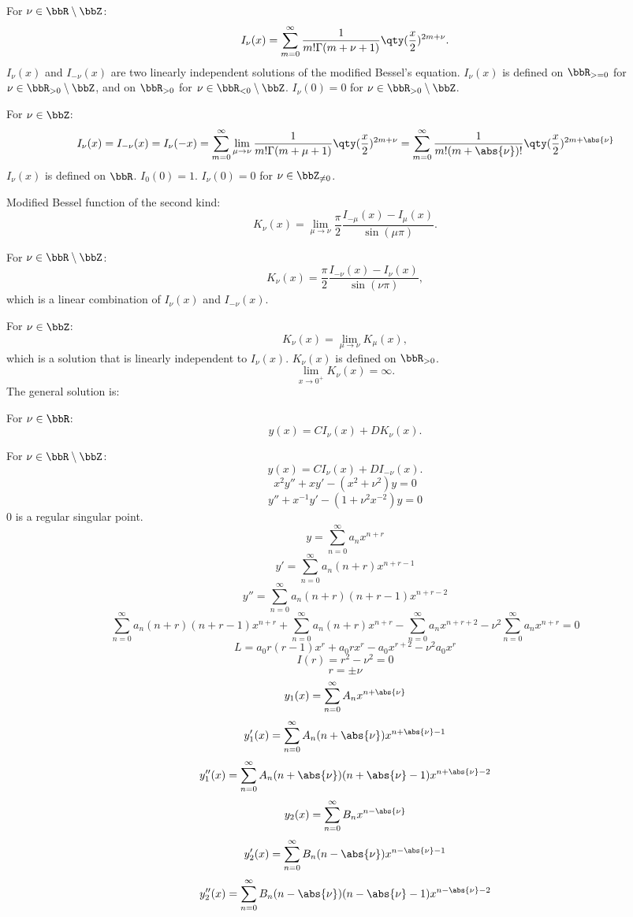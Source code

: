 \documentclass[a4paper,12pt]{report}
\begin{document}
\bit
\item For $\nu\in\bbR\setminus\bbZ$:
    \[I_{\nu}(x)=\sum_{m=0}^{\infty}\frac{1}{m!\Gamma(m+\nu+1)}\qty(\frac{x}{2})^{2m+\nu}.\]
    $I_{\nu}(x)$ and $I_{-\nu}(x)$ are two linearly independent solutions of the modified Bessel's equation. $I_{\nu}(x)$ is defined on $\bbR_{>=0}$ for $\nu\in\bbR_{>0}\setminus\bbZ$, and on $\bbR_{>0}$ for $\nu\in\bbR_{<0}\setminus\bbZ$. $I_{\nu}(0)=0$ for $\nu\in\bbR_{>0}\setminus\bbZ$.
\item For $\nu\in\bbZ$:
    \[I_{\nu}(x)=I_{-\nu}(x)=I_{\nu}(-x)=\sum_{m=0}^{\infty}\lim_{\mu\to\nu}\frac{1}{m!\Gamma(m+\mu+1)}\qty(\frac{x}{2})^{2m+\nu}=\sum_{m=0}^{\infty}\frac{1}{m!(m+\abs{\nu})!}\qty(\frac{x}{2})^{2m+\abs{\nu}}\]
    $I_{\nu}(x)$ is defined on $\bbR$. $I_0(0)=1$. $I_{\nu}(0)=0$ for $\nu\in\bbZ_{\ne0}$. 
\eit
\item Modified Bessel function of the second kind:
    \[K_{\nu}(x)=\lim_{\mu\to\nu}\frac{\pi}{2}\frac{I_{-\mu}(x)-I_{\mu}(x)}{\sin(\mu\pi)}.\]
\bit
\item For $\nu\in\bbR\setminus\bbZ$:
    \[K_{\nu}(x)=\frac{\pi}{2}\frac{I_{-\nu}(x)-I_{\nu}(x)}{\sin(\nu\pi)},\]
    which is a linear combination of $I_{\nu}(x)$ and $I_{-\nu}(x)$.
\item For $\nu\in\bbZ$:
    \[K_{\nu}(x)=\lim_{\mu\to\nu}K_{\mu}(x),\]
    which is a solution that is linearly independent to $I_{\nu}(x)$. $K_{\nu}(x)$ is defined on $\bbR_{>0}$.
    \[\lim_{x\to0^+}K_{\nu}(x)=\infty.\]
\eit
\eit
The general solution is:
\bit
\item For $\nu\in\bbR$:
    \[y(x)=CI_{\nu}(x)+DK_{\nu}(x).\]
\item For $\nu\in\bbR\setminus\bbZ$:
    \[y(x)=CI_{\nu}(x)+DI_{-\nu}(x).\]
\eit
\bpr
\[x^2y''+xy'-(x^2+\nu^2)y=0\]
\[y''+x^{-1}y'-(1+\nu^2x^{-2})y=0\]
$0$ is a regular singular point.
\[y=\sum_{n=0}^{\infty}a_nx^{n+r}\]
\[y'=\sum_{n=0}^{\infty}a_n(n+r)x^{n+r-1}\]
\[y''=\sum_{n=0}^{\infty}a_n(n+r)(n+r-1)x^{n+r-2}\]
\[\sum_{n=0}^{\infty}a_n(n+r)(n+r-1)x^{n+r}+\sum_{n=0}^{\infty}a_n(n+r)x^{n+r}-\sum_{n=0}^{\infty}a_nx^{n+r+2}-\nu^2\sum_{n=0}^{\infty}a_nx^{n+r}=0\]
\[L=a_0r(r-1)x^r+a_0rx^r-a_0x^{r+2}-\nu^2a_0x^r\]
\[I(r)=r^2-\nu^2=0\]
\[r=\pm\nu\]
\[y_1(x)=\sum_{n=0}^{\infty}A_nx^{n+\abs{\nu}}\]
\[y_1'(x)=\sum_{n=0}^{\infty}A_n(n+\abs{\nu})x^{n+\abs{\nu}-1}\]
\[y_1''(x)=\sum_{n=0}^{\infty}A_n(n+\abs{\nu})(n+\abs{\nu}-1)x^{n+\abs{\nu}-2}\]
\[y_2(x)=\sum_{n=0}^{\infty}B_nx^{n-\abs{\nu}}\]
\[y_2'(x)=\sum_{n=0}^{\infty}B_n(n-\abs{\nu})x^{n-\abs{\nu}-1}\]
\[y_2''(x)=\sum_{n=0}^{\infty}B_n(n-\abs{\nu})(n-\abs{\nu}-1)x^{n-\abs{\nu}-2}\]
\end{document}
